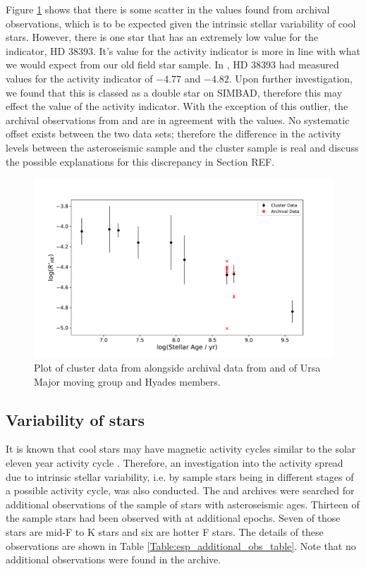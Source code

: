 Figure \ref{fig:cluster_data_comparison} shows that there is some scatter in the \Rprime values found from archival observations, which is to be expected given the intrinsic stellar variability of cool stars. However, there is one star that has an extremely low value for the \Rprime indicator, HD 38393. It's value for the \Rprime activity indicator is more in line with what we would expect from our old field star sample. In \citet{Mamajek_Hillenbrand_2008}, HD 38393 had measured values for the \Rprime activity indicator of $-4.77$ and $-4.82$. Upon further investigation, we found that this is classed as a double star on SIMBAD, therefore this may effect the value of the \Rprime activity indicator. With the exception of this outlier, the archival observations from \esp and \narval are in agreement with the \citet{Mamajek_Hillenbrand_2008} values. No systematic offset exists between the two data sets; therefore the difference in the activity levels between the asteroseismic sample and the cluster sample is real and discuss the possible explanations for this discrepancy in Section REF.

\begin{figure}
    \centering
    \includegraphics[scale=0.5]{Figures/4-Chromospheric_age/cluster_data.pdf}
    \caption[Analysis of cluster members]{Plot of cluster data from \citet{Mamajek_Hillenbrand_2008} alongside archival data from \esp and \narval of Ursa Major moving group and Hyades members.}
    \label{fig:cluster_data_comparison}
\end{figure}

\subsection{Variability of stars}
It is known that cool stars may have magnetic activity cycles similar to the solar eleven year activity cycle \citep{Wilson_1978,Baliunas_etal_1995}. Therefore, an investigation into the activity spread due to intrinsic stellar variability, i.e. by sample stars being in different stages of a possible activity cycle, was also conducted. The \esp and \narval archives were searched for additional observations of the sample of stars with asteroseismic ages. Thirteen of the sample stars had been observed with \esp at additional epochs. Seven of those stars are mid-F to K stars and six are hotter F stars. The details of these observations are shown in Table \ref{Table:esp_additional_obs_table}. Note that no additional observations were found in the \narval archive.


